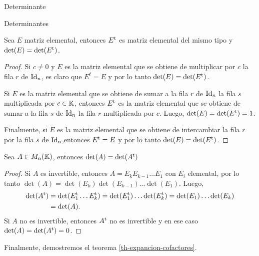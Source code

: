 \begin{chapter}{Determinante}
\begin{section}{Determinantes}
    \begin{teorema}
        Sea $E$ matriz elemental, entonces $E^{\operatorname{t}}$ es matriz elemental del mismo tipo y $\det(E) = \det(E^{\operatorname{t}})$.
    \end{teorema}
    \begin{proof}
        Si $c \not=0$ y $E$ es la matriz elemental que se obtiene de multiplicar por  $c$ la fila $r$ de $\operatorname{Id}_n$, es claro que $E^t = E$ y por lo tanto 	$\det(E) = \det(E^{\operatorname{t}})$.

        Si $E$ es la matriz elemental que se obtiene de sumar a la fila $r$ de $\operatorname{Id}_n$ la fila $s$ multiplicada por $c \in \mathbb K$,  entonces  $E^{\operatorname{t}}$  es la matriz elemental que se obtiene de sumar a la fila $s$ de $\operatorname{Id}_n$ la fila $r$ multiplicada por $c$. Luego,   $\det(E) = \det(E^{\operatorname{t}}) = 1$.

        Finalmente, si $E$ es la  matriz elemental que se obtiene de intercambiar la fila $r$ por la fila $s$ de $\operatorname{Id}_n$,entonces $E^{\operatorname{t}} = E$ y por lo tanto $\det(E) = \det(E^{\operatorname{t}})$.
    \end{proof}

    \begin{teorema}\label{th-det-a-trans-app}
        Sea $A \in M_n(\mathbb K)$,  entonces
        $\det(A) = \det(A^{\operatorname{t}})$
    \end{teorema}
    \begin{proof}
        Si $A$ es invertible, entonces  $A = E_kE_{k-1}\ldots E_1$ con $E_i$ elemental, por lo tanto $\det(A) = \det( E_k)\det(E_{k-1})\ldots \det(E_1)$. Luego,
        \begin{align*}
            \det(A^{\operatorname{t}}) & = \det(E_1^{\operatorname{t}} \ldots E_k^{\operatorname{t}}) = \det(E_1^{\operatorname{t}}) \ldots \det(E_k^{\operatorname{t}}) =
            \det(E_1) \ldots \det(E_k)                                                     \\&= \det(A).
        \end{align*}
        Si $A$ no es invertible, entonces $A^{\operatorname{t}}$ no es invertible y en ese caso $\det(A) = \det(A^{\operatorname{t}})=0$.
    \end{proof}

    Finalmente,  demostremos el teorema \ref{th-expancion-cofactores}.


\end{section}
\end{chapter}
